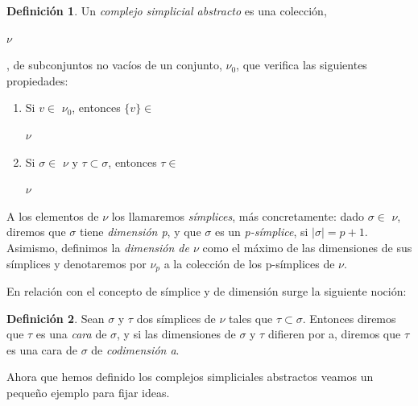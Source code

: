 \documentclass[12pt, a4paper]{article}
\numberwithin{equation}{section}
\theoremstyle{definition}
\newtheorem{defi}{Definición}
\theoremstyle{remark}
\theoremstyle{plain}
\begin{document}
	\begin{defi}
	
	Un \textit{complejo simplicial abstracto} es una colección, 
	\begin{Large}$\nu$\end{Large}, de subconjuntos no vacíos de un 
	conjunto, {\Large $\nu$}$_{0}$, que verifica las siguientes 
	propiedades:
	
	\begin{enumerate}
		\item Si $v \in $ {\Large $ \nu$}$_{0}$, entonces $\{v\} \in$
			\begin{Large}$ \nu$\end{Large}
		\item Si $\sigma \in $ {\Large $ \nu$}$ \text{ y } \tau 
			\subset \sigma$, entonces $ \tau \in $
			\begin{Large}$ \nu$\end{Large}
	\end{enumerate}
	
	A los elementos de {\Large $\nu$} los llamaremos \textit{símplices},
	más concretamente: dado $\sigma \in $ {\Large $\nu$}, diremos que 
	$\sigma$ tiene \textit{dimensión p}, y que $\sigma$ es un 
	\textit{p-símplice}, si $|\sigma|=p+1$. Asimismo, definimos la 
	\textit{dimensión de {\Large $\nu$}} como el máximo de las dimensiones 
	de sus símplices y denotaremos por {\Large $\nu$}$_{p}$ a la colección 
	de los p-símplices de {\Large $\nu$}.	
	
	\end{defi}
	
	En relación con el concepto de símplice y de dimensión surge la 
	siguiente noción: 

	\begin{defi}
		Sean $\sigma$ y $\tau$ dos símplices de {\Large $\nu$} tales 
		que $\tau \subset \sigma$. Entonces diremos que $\tau$ es una 
		\textit{cara} de $\sigma$, y si las dimensiones de $\sigma$ y 
		$\tau$ difieren por a, diremos que $\tau$ es una cara de 
		$\sigma$ de \textit{codimensión a}.
	\end{defi}

	Ahora que hemos definido los complejos simpliciales abstractos veamos 
	un pequeño ejemplo para fijar ideas.
\end{document}
